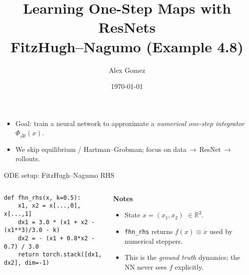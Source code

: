 \documentclass[aspectratio=169]{beamer}
\title{Learning One-Step Maps with ResNets\\\small FitzHugh–Nagumo (Example 4.8)}
\author{Alex Gomez}
\date{\today}
\begin{document}
\begin{frame}
  \titlepage
  \vspace{-1ex}
  \begin{itemize}
    \item Goal: train a neural network to approximate a \emph{numerical one-step integrator} \(\Phi_{\Delta t}(x)\).
    \item We skip equilibrium / Hartman--Grobman; focus on data\,$\to$\,ResNet\,$\to$\,rollouts.
  \end{itemize}
\end{frame}

\begin{frame}[fragile]{ODE setup: FitzHugh--Nagumo RHS}
\begin{columns}[T,totalwidth=\textwidth]
\begin{column}{0.55\textwidth}
\begin{lstlisting}[style=py,caption={Vector field definition},label={lst:rhs}]
def fhn_rhs(x, k=0.5):
    x1, x2 = x[...,0], x[...,1]
    dx1 = 3.0 * (x1 + x2 - (x1**3)/3.0 - k)
    dx2 = - (x1 + 0.8*x2 - 0.7) / 3.0
    return torch.stack([dx1, dx2], dim=-1)
\end{lstlisting}
\end{column}
\begin{column}{0.45\textwidth}
\textbf{Notes}
\begin{itemize}
  \item State \(x=(x_1,x_2)\) \(\in\mathbb{R}^2\).
  \item \texttt{fhn\_rhs} returns \(f(x)\equiv\dot x\) used by numerical steppers.
  \item This is the \emph{ground truth} dynamics; the NN never sees $f$ explicitly.
\end{itemize}
\end{column}
\end{columns}
\end{frame}
\end{document}
